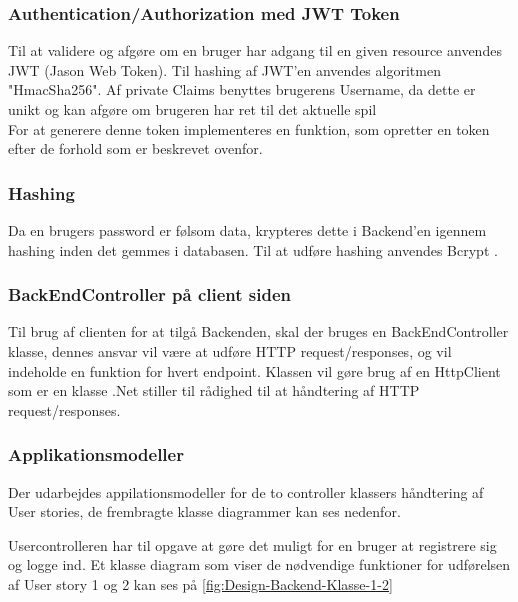 \subsubsection{Authentication/Authorization med JWT Token}
Til at validere og afgøre om en bruger har adgang til en given resource anvendes JWT (Jason Web Token). Til hashing af JWT'en anvendes algoritmen "HmacSha256". Af private Claims benyttes brugerens Username, da dette er unikt og kan afgøre om brugeren har ret til det aktuelle spil\\

For at generere denne token implementeres en funktion, som opretter en token efter de forhold som er beskrevet ovenfor.\\


\subsubsection{Hashing}
\label{sssec: Hashing}
Da en brugers password er følsom data, krypteres dette i Backend'en igennem hashing inden det gemmes i databasen. Til at udføre hashing anvendes Bcrypt \cite{Bcrypt}.


\subsubsection{BackEndController på client siden}
Til brug af clienten for at tilgå Backenden, skal der bruges en BackEndController klasse, dennes ansvar vil være at udføre HTTP request/responses, og vil indeholde en funktion for hvert endpoint. Klassen vil gøre brug af en HttpClient som er en klasse .Net stiller til rådighed til at håndtering af HTTP request/responses.


\subsubsection{Applikationsmodeller}
Der udarbejdes appilationsmodeller for de to controller klassers håndtering af User stories, de frembragte klasse diagrammer kan ses nedenfor.

Usercontrolleren har til opgave at gøre det muligt for en bruger at registrere sig og logge ind. Et klasse diagram som viser de nødvendige funktioner for udførelsen af User story 1 og 2 kan ses på \autoref{fig:Design-Backend-Klasse-1-2}


